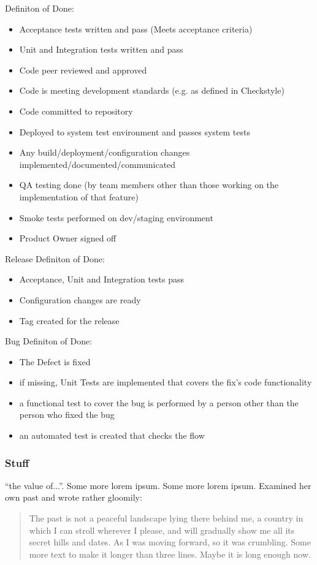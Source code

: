Definiton of Done:
\begin{itemize}
    \item Acceptance tests written and pass (Meets acceptance criteria)
    \item Unit and Integration tests written and pass
    \item Code peer reviewed and approved
		\item Code is meeting development standards (e.g. as defined in Checkstyle)
    \item Code committed to repository
		\item Deployed to system test environment and passes system tests
		\item Any build/deployment/configuration changes implemented/documented/communicated
    \item QA testing done (by team members other than those working on the implementation of that feature)
		\item Smoke tests performed on dev/staging environment
    \item Product Owner signed off
\end{itemize}

Release Definiton of Done:
\begin{itemize}
    \item Acceptance, Unit and Integration tests pass
    \item Configuration changes are ready
		\item Tag created for the release
\end{itemize}

Bug Definiton of Done:
\begin{itemize}
    \item The Defect is fixed
    \item if missing, Unit Tests are implemented that covers the fix’s code functionality
		\item a functional test to cover the bug is performed by a person other than the person who fixed the bug
		\item an automated test is created that checks the flow
\end{itemize}

\subsubsection{Stuff}
\enquote{the value of...}.
Some more lorem ipsum. Some more lorem ipsum. Examined her own past and wrote rather gloomily:
\blockquote{The past is not a peaceful landscape lying there behind me, 
a country in which I can stroll wherever I please, 
and will gradually show me all its secret hills and dates. 
As I was moving forward, so it was crumbling. 
Some more text to make it longer than three lines. 
Maybe it is long enough now.}

